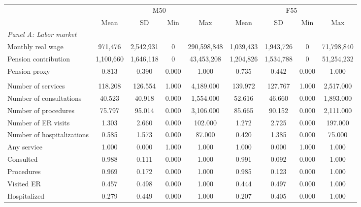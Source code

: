 \begin{tabular}{lcccccccc}
\toprule
& \multicolumn{4}{c}{M50} & \multicolumn{4}{c}{F55} \\
\cmidrule(l){2-5} \cmidrule(l){6-9}
& Mean & SD & Min & Max & Mean & SD & Min & Max \\
\midrule
\multicolumn{9}{l}{\textit{Panel A: Labor market}} \\
Monthly real wage &       971,476 &     2,542,931 &             0 &   290,598,848 &     1,039,433 &     1,943,726 &             0 &    71,798,840 \\ 
Pension contribution &     1,100,660 &     1,646,118 &             0 &    43,453,208 &     1,204,826 &     1,534,788 &             0 &    51,254,232 \\ 
Pension proxy &         0.813 &         0.390 &         0.000 &         1.000 &         0.735 &         0.442 &         0.000 &         1.000 \\ \addlinespace
\multicolumn{9}{l}{\textit{Panel B: Health}} \\
Number of services &    118.208 &    126.554 &      1.000 &  4,189.000 &    139.972 &    127.767 &      1.000 &  2,517.000 \\ 
Number of consultations &     40.523 &     40.918 &      0.000 &  1,554.000 &     52.616 &     46.660 &      0.000 &  1,893.000 \\ 
Number of procedures &     75.797 &     95.014 &      0.000 &  3,106.000 &     85.665 &     90.152 &      0.000 &  2,111.000 \\ 
Number of ER visits &      1.303 &      2.660 &      0.000 &    102.000 &      1.272 &      2.725 &      0.000 &    197.000 \\ 
Number of hospitalizations &      0.585 &      1.573 &      0.000 &     87.000 &      0.420 &      1.385 &      0.000 &     75.000 \\ 
Any service &      1.000 &      0.000 &      1.000 &      1.000 &      1.000 &      0.000 &      1.000 &      1.000 \\ 
Consulted &      0.988 &      0.111 &      0.000 &      1.000 &      0.991 &      0.092 &      0.000 &      1.000 \\ 
Procedures &      0.969 &      0.172 &      0.000 &      1.000 &      0.985 &      0.123 &      0.000 &      1.000 \\ 
Visited ER &      0.457 &      0.498 &      0.000 &      1.000 &      0.444 &      0.497 &      0.000 &      1.000 \\ 
Hospitalized &      0.279 &      0.449 &      0.000 &      1.000 &      0.207 &      0.405 &      0.000 &      1.000 \\ 

\end{tabular}
